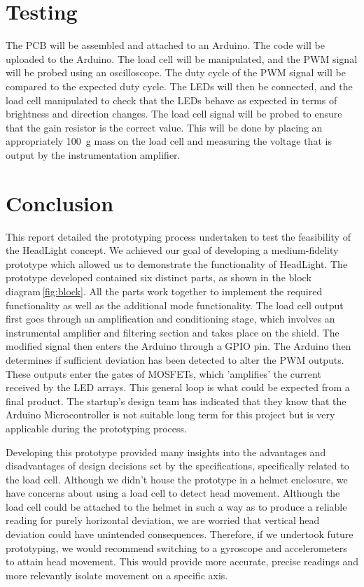 \documentclass[twoside]{article}
\begin{document}
\section{Testing}
    The PCB will be assembled and attached to an Arduino. The code will be uploaded to the Arduino. The load cell will be manipulated, and the PWM signal will be probed using an oscilloscope. The duty cycle of the PWM signal will be compared to the expected duty cycle.
    The LEDs will then be connected, and the load cell manipulated to check that the LEDs behave as expected in terms of brightness and direction changes. 
    The load cell signal will be probed to ensure that the gain resistor is the correct value. This will be done by placing an appropriately \SI{100}{\gram} mass on the load cell and measuring the voltage that is output by the instrumentation amplifier.

\section{Conclusion}
    This report detailed the prototyping process undertaken to test the feasibility of the HeadLight concept. We achieved our goal of developing a medium-fidelity prototype which allowed us to demonstrate the functionality of HeadLight. The prototype developed contained six distinct parts, as shown in the block diagram \ref{fig:block}. All the parts work together to implement the required functionality as well as the additional mode functionality. The load cell output first goes through an amplification and conditioning stage, which involves an instrumental amplifier and filtering section and takes place on the shield. The modified signal then enters the Arduino through a GPIO pin. The Arduino then determines if sufficient deviation has been detected to alter the PWM outputs. These outputs enter the gates of MOSFETs, which 'amplifies' the current received by the LED arrays. This general loop is what could be expected from a final product. The startup's design team has indicated that they know that the Arduino Microcontroller is not suitable long term for this project but is very applicable during the prototyping process. 

    Developing this prototype provided many insights into the advantages and disadvantages of design decisions set by the specifications, specifically related to the load cell. Although we didn't house the prototype in a helmet enclosure, we have concerns about using a load cell to detect head movement. Although the load cell could be attached to the helmet in such a way as to produce a reliable reading for purely horizontal deviation, we are worried that vertical head deviation could have unintended consequences. Therefore, if we undertook future prototyping, we would recommend switching to a gyroscope and accelerometers to attain head movement. This would provide more accurate, precise readings and more relevantly isolate movement on a specific axis. 
\end{document}
